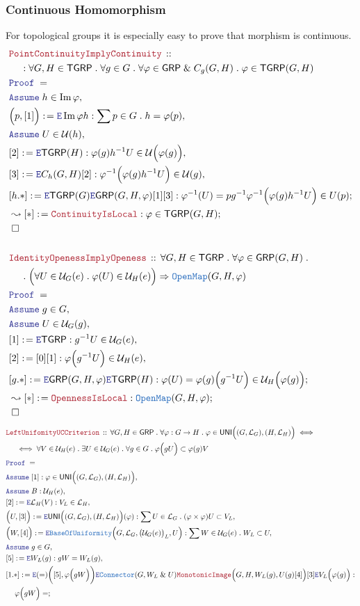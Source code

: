 \documentclass[12pt]{scrartcl}
\newcommand{\TYPE}[1]{\textcolor{NavyBlue}{\mathtt{#1}}}
\newcommand{\LOGIC}[1]{\textcolor{Blue}{\mathtt{#1}}}
\newcommand{\THM}[1]{\textcolor{Maroon}{\mathtt{#1}}}
\renewcommand{\.}{\; . \;}
\newcommand{\de}{: \kern 0.1pc =}
\newcommand{\Theorem}[2]{& \THM{#1} \, :: \, #2 \\ & \Proof = \\ }
\newcommand{\NewLine}{\\ & \kern 1pc}
\newcommand{\Page}[1]{ \begin{align*} #1 \end{align*}   }
\renewcommand{\And}{\; \& \;}
\newcommand{\Imply}{\Rightarrow}
\DeclareMathOperator*{\im}{Im}
\newcommand{\Say}[3]{& #1 \de #2 : #3, \\}
\newcommand{\Conclude}[3]{& #1 \de #2 : #3; \\}
\newcommand{\DeriveConclude}[3]{& \leadsto #1 \de #2 : #3 ; \\}
\newcommand{\Assume}[2]{& \LOGIC{Assume} \; #1 : #2, \\}
\newcommand{\AssumeIn}[2]{& \LOGIC{Assume} \; #1 \in #2, \\}
\newcommand{\Elim}{\LOGIC{E}}
\newcommand{\QED}{\; \square}
\newcommand{\EndProof}{& \QED \\}
\newcommand{\Proof}{\LOGIC{Proof} \; }
\newcommand{\OM}{\TYPE{OpenMap}}
\renewcommand{\U}{\mathcal{U}}
\newcommand{\UNI}{\mathsf{UNI}}
\renewcommand{\L}{\mathcal{L}}
\newcommand{\GRP}{\mathsf{GRP}}
\newcommand{\Connector}{\TYPE{Connector}}
\newcommand{\BofU}{\TYPE{BaseOfUniformity}}
\newcommand{\TGRP}{\mathsf{TGRP}}
\renewcommand{\L}{\mathcal{L}}
\begin{document}
\subsubsection{Continuous Homomorphism}
For topological groups it is especially easy to prove that
morphism is continuous.
\Page{
	\Theorem{PointContinuityImplyContinuity}
	{
		\NewLine :		
		\forall G,H \in \TGRP \.
		\forall g \in G \.
		\forall \varphi \in \GRP \And C_g(G,H) \.
		\varphi \in \TGRP(G,H)
	}
	\AssumeIn{h}{\im \varphi}
	\Say{\Big(p,[1]\Big)}{\Elim \im \varphi h}{
		\sum p \in G \. h = \varphi(p)
	}	
	\AssumeIn{U}{\U(h)}
	\Say{[2]}{\Elim \TGRP(H)}{\varphi(g)h^{-1}U \in \U\Big(\varphi(g)\Big)}
	\Say{[3]}{\Elim  C_h(G,H)[2]}{
				\varphi^{-1}\Big( \varphi(g)h^{-1} U \Big) \in \U(g)
	}
	\Conclude{[h.*]}{\Elim \TGRP(G)\Elim \GRP(G,H,\varphi)[1][3]}
	{
	   \varphi^{-1}(U) = pg^{-1} \varphi^{-1}\Big( \varphi(g)h^{-1} U \Big) \in U(p)
	}
	\DeriveConclude{[*]}{\THM{ContinuityIsLocal}}
	{
		\varphi \in \TGRP(G,H)
	}
	\EndProof
	\\
	\Theorem{IdentityOpenessImplyOpeness}
	{
		\forall G,H \in \TGRP \.
		\forall \varphi \in \GRP(G,H) \. \NewLine \.
		\Big( \forall U \in \U_G(e) \. \varphi(U) \in \U_H(e) \Big)
		\Imply \OM(G,H,\varphi)
	}
	\AssumeIn{g}{G}
	\AssumeIn{U}{\U_G(g)}
	\Say{[1]}{\Elim \TGRP}{g^{-1} U \in \U_G(e)}
	\Say{[2]}{[0][1]}{
		\varphi\Big(  g^{-1} U \Big) \in \U_H(e)   
	}
	\Conclude{[g.*]}{
		\Elim \GRP(G,H,\varphi)
		\Elim \TGRP(H)	
	}
	{
		\varphi(U) =  \varphi(g)\Big( g^{-1} U \Big) \in \U_H\Big( \varphi(g) \Big)
	}
	\DeriveConclude{[*]}
	{
		\THM{OpennessIsLocal} 
	}{
			\OM(G,H,\varphi)
	}
	\EndProof
}\Page{
	\Theorem{LeftUnifomityUCCriterion}
	{
		\forall G,H \in \GRP \.
		\forall \varphi : G \to H \.
		\varphi \in \UNI\Big((G,\L_G),(H,\L_H)\Big)
		\iff \NewLine \iff
		\forall V \in \U_H(e) \.
		\exists U \in \U_G(e) \.
		\forall g \in G \.
		\varphi\Big(g U \Big) \subset \varphi(g) V
	}
	\Assume{[1]}{\varphi \in \UNI\Big((G,\L_G),(H,\L_H)\Big)}
	\Assume{B}{\U_H(e)}
	\Say{[2]}{\Elim \L_H(V)}{V_L \in \L_H}
	\Say{\Big(U,[3]\Big)}{
		\Elim \UNI\Big((G,\L_G),(H,\L_H)\Big)(\varphi)
	}{
		\sum U \in \L_G \. (\varphi \times \varphi) U \subset V_L
	}
	\Say{\Big(W,[4]\Big)}{\Elim \BofU\Big(G,\L_G,\big(\U_{G}(e)\big)_L,U\Big)}
	{
		\sum W \in \U_G(e) \. W_L \subset U
	}
	\AssumeIn{g}{G}
	\Say{[5]}{\Elim W_L(g)}{  g W = W_L(g)  }
	\Conclude{[1.*]}{
		\Elim (=)\bigg([5],\varphi\Big( g W \Big)\bigg)
		\Elim \Connector(G, W_L \And U)
		\THM{MonotonicImage}\Big(G,H,W_L(g),U(g)[4]\Big)
		[3]
		\Elim 	V_L\Big( \varphi(g) \Big)
	}
	{
		\NewLine 		
		\varphi\Big( g W \Big) =
}}
\end{document}
